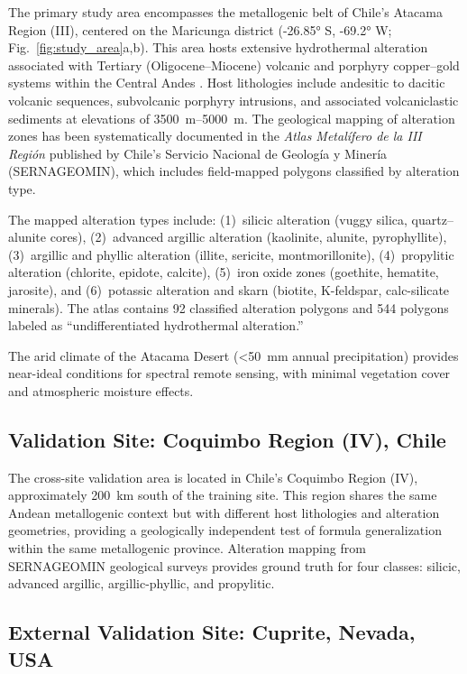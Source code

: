 \documentclass[preprint,authoryear,number]{elsarticle}
\begin{document}
The primary study area encompasses the metallogenic belt of Chile's Atacama Region (III), centered on the Maricunga district (\ang{-26.85} S, \ang{-69.2} W; Fig.~\ref{fig:study_area}a,b). This area hosts extensive hydrothermal alteration associated with Tertiary (Oligocene--Miocene) volcanic and porphyry copper--gold systems within the Central Andes \citep{Sillitoe1991,Vila1991}. Host lithologies include andesitic to dacitic volcanic sequences, subvolcanic porphyry intrusions, and associated volcaniclastic sediments at elevations of \SIrange{3500}{5000}{\meter}. The geological mapping of alteration zones has been systematically documented in the \emph{Atlas Metal\'ifero de la III Regi\'on} published by Chile's Servicio Nacional de Geolog\'ia y Miner\'ia (SERNAGEOMIN), which includes field-mapped polygons classified by alteration type.

The mapped alteration types include: (1)~silicic alteration (vuggy silica, quartz--alunite cores), (2)~advanced argillic alteration (kaolinite, alunite, pyrophyllite), (3)~argillic and phyllic alteration (illite, sericite, montmorillonite), (4)~propylitic alteration (chlorite, epidote, calcite), (5)~iron oxide zones (goethite, hematite, jarosite), and (6)~potassic alteration and skarn (biotite, K-feldspar, calc-silicate minerals). The atlas contains 92 classified alteration polygons and 544 polygons labeled as ``undifferentiated hydrothermal alteration.''

The arid climate of the Atacama Desert (\textless\SI{50}{\milli\meter} annual precipitation) provides near-ideal conditions for spectral remote sensing, with minimal vegetation cover and atmospheric moisture effects.

\subsection{Validation Site: Coquimbo Region (IV), Chile}

The cross-site validation area is located in Chile's Coquimbo Region (IV), approximately \SI{200}{\kilo\meter} south of the training site. This region shares the same Andean metallogenic context but with different host lithologies and alteration geometries, providing a geologically independent test of formula generalization within the same metallogenic province. Alteration mapping from SERNAGEOMIN geological surveys provides ground truth for four classes: silicic, advanced argillic, argillic-phyllic, and propylitic.

\subsection{External Validation Site: Cuprite, Nevada, USA}
\end{document}
